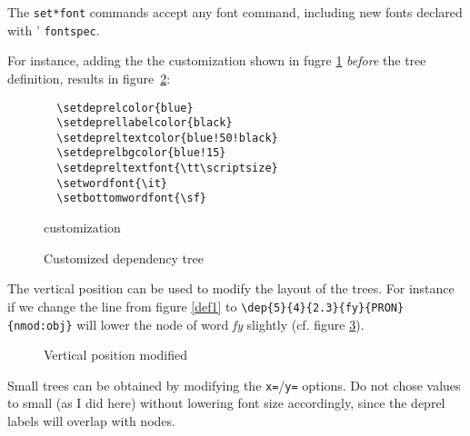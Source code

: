 \documentclass[12pt]{article}
\begin{document}
The \verb:set*font: commands accept any font command, including new
fonts declared with \XeLaTeX' \verb:fontspec:.

For instance, adding the the customization shown in fugre \ref{def2}
\emph{before} 
the tree definition, results in figure~\ref{ex2}:

\begin{figure}[H]
\begin{verbatim}
  \setdeprelcolor{blue}
  \setdeprellabelcolor{black}
  \setdepreltextcolor{blue!50!black}
  \setdeprelbgcolor{blue!15}
  \setdepreltextfont{\tt\scriptsize}
  \setwordfont{\it}
  \setbottomwordfont{\sf}
\end{verbatim}
\caption{customization}\label{def2}
\end{figure}



\setdepreltextfont{\tt\scriptsize}
\setwordfont{\it}
\setbottomwordfont{\sf}


\begin{figure}[H]
\beispiel
\caption{Customized dependency tree}\label{ex2}
\end{figure}



The vertical position can be used to modify the layout of the
trees. For instance if we change the line from figure \ref{def1}
to \verb+\dep{5}{4}{2.3}{fy}{PRON}{nmod:obj}+
 will lower the node of
word \emph{fy} slightly (cf. figure \ref{ex3}).



\begin{figure}[H]
\caption{Vertical position modified}\label{ex3}
\end{figure}


Small trees can be obtained by modifying the \verb:x=:/\verb:y=:
options. Do not chose values to small (as I did here) without lowering
font size accordingly, since the
deprel labels will overlap with nodes.
\end{document}
